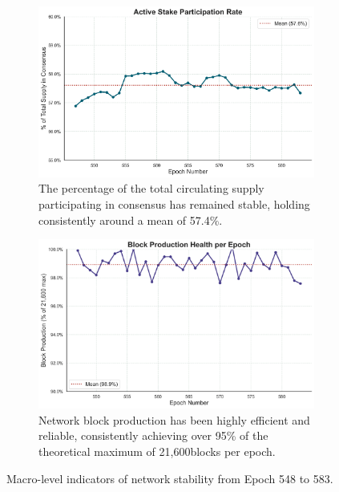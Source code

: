 \documentclass[11pt, letterpaper]{article}
\begin{document}
\begin{figure}[H]
	\centering
	\begin{subfigure}{0.48\textwidth}
		\includegraphics[width=\textwidth]{img/active_stake_participation.png}
		\caption{The percentage of the total circulating supply participating in 
        consensus has remained stable, holding consistently around a mean of 57.4\%.}\label{fig:stake_participation}
	\end{subfigure}
	\hfill %
	\begin{subfigure}{0.48\textwidth}
		\includegraphics[width=\textwidth]{img/block_production_health.png}
		\caption{Network block production has been highly efficient and reliable, consistently 
        achieving over 95\% of the theoretical maximum of 21,600blocks per epoch.}\label{fig:block_health}
	\end{subfigure}
	\caption{Macro-level indicators of network stability from Epoch 548 to 583.}
	\label{fig:macro_stability}
\end{figure}
\end{document}
